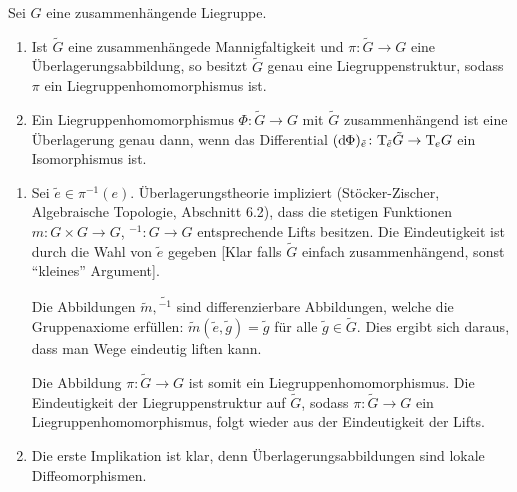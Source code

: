 \begin{lemma}[label=lem:132]
    Sei $G$ eine zusammenhängende Liegruppe.
    \begin{enumerate}[1)]
        \item Ist $\tilde{G}$ eine zusammenhängede Mannigfaltigkeit und $\pi \colon \tilde{G} \to G$ eine Überlagerungsabbildung, so besitzt $\tilde{G}$ genau eine Liegruppenstruktur, sodass $\pi$ ein Liegruppenhomomorphismus ist.
        \item Ein Liegruppenhomomorphismus $\Phi \colon \tilde{G} \to G$ mit $\tilde{G}$ zusammenhängend ist eine Überlagerung genau dann, wenn das Differential $(\mathrm{d}\mkern-1.0mu \Phi)_{\tilde{e}} \colon \mathrm{T}\mkern-0.85mu_{\tilde{e}} \tilde{G} \to \mathrm{T}\mkern-0.85mu_e G$ ein Isomorphismus ist.
    \end{enumerate}
\end{lemma}
\begin{beweis}
    \begin{enumerate}[(1)]
        \item Sei $\tilde{e} \in \pi^{-1}(e)$.
        Überlagerungstheorie impliziert (Stöcker-Zischer, Algebraische Topologie, Abschnitt 6.2), dass die stetigen Funktionen $m \colon G \times G \to G$, $^{-1} \colon G \to G$ entsprechende Lifts besitzen.
        Die Eindeutigkeit ist durch die Wahl von $\tilde{e}$ gegeben [Klar falls $\tilde{G}$ einfach zusammenhängend, sonst \enquote{kleines} Argument].
        
        Die Abbildungen $\tilde{m},\tilde{{ }^{-1}}$ sind differenzierbare Abbildungen, welche die Gruppenaxiome erfüllen: $\tilde{m} (\tilde{e}, \tilde{g}) = \tilde{g}$ für alle $\tilde{g} \in \tilde{G}$.
        Dies ergibt sich daraus, dass man Wege eindeutig liften kann.
        
        Die Abbildung $\pi \colon \tilde{G} \to G$ ist somit ein Liegruppenhomomorphismus.
        Die Eindeutigkeit der Liegruppenstruktur auf $\tilde{G}$, sodass $\pi \colon \tilde{G} \to G$ ein Liegruppenhomomorphismus, folgt wieder aus der Eindeutigkeit der Lifts.
        \item Die erste Implikation ist klar, denn Überlagerungsabbildungen sind lokale Diffeomorphismen.
        

\end{enumerate}
\end{beweis}
